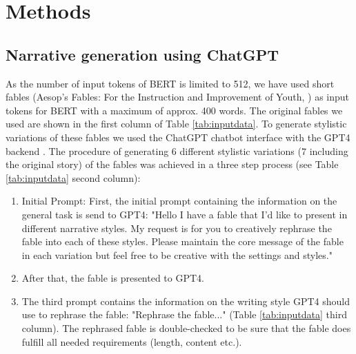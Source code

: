 \section*{Methods}
\subsection*{Narrative generation using ChatGPT}
As the number of input tokens of BERT is limited to 512, we have used short fables (Aesop's Fables: For the Instruction and Improvement of Youth, \cite{1834aesop}) as input tokens for BERT with a maximum of approx. 400 words. The original fables we used are shown in the first column of Table \ref{tab:inputdata}. 
To generate stylistic variations of these fables we used the ChatGPT chatbot interface with the GPT4 backend \cite{radford2019language}. The procedure of generating 6 different stylistic variations (7 including the original story) of the fables was achieved in a three step process (see Table \ref{tab:inputdata} second column):
\begin{enumerate}
    \item{Initial Prompt: First, the initial prompt containing the information on the general task is send to GPT4: "Hello I have a fable that I'd like to present in different narrative styles. My request is for you to creatively rephrase the fable into each of these styles. Please maintain the core message of the fable in each variation but feel free to be creative with the settings and styles."}
    \item{After that, the fable is presented to GPT4.}
    \item{The third prompt contains the information on the writing style GPT4 should use to rephrase the fable: "Rephrase the fable..." (Table \ref{tab:inputdata} third column). The rephrased fable is double-checked to be sure that the fable does fulfill all needed requirements (length, content etc.).}
\end{enumerate}

